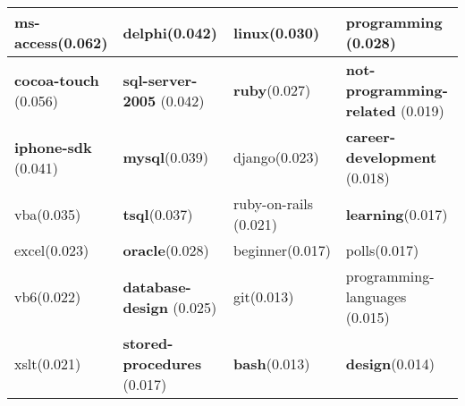 \begin{table}[htbp]
\begin{tabular}{|p{40pt}||p{40pt}||p{40pt}||p{40pt}|}
\hline
 ms-access(0.062)& delphi(0.042)& \textbf{linux}(0.030)& programming (0.028) \\ 
\hline
 \textbf{cocoa-touch} (0.056)& \textbf{sql-server-2005} (0.042)& \textbf{ruby}(0.027)& \textbf{not-programming-related} (0.019) \\ 
\hline
 \textbf{iphone-sdk} (0.041)& \textbf{mysql}(0.039)& django(0.023)& \textbf{career-development} (0.018) \\ 
\hline
 vba(0.035)& \textbf{tsql}(0.037)& ruby-on-rails (0.021)& \textbf{learning}(0.017) \\ 
\hline
 excel(0.023)& \textbf{oracle}(0.028)& beginner(0.017)& polls(0.017) \\ 
\hline
 vb6(0.022)& \textbf{database-design} (0.025)& git(0.013)& programming-languages (0.015) \\ 
\hline
 xslt(0.021)& \textbf{stored-procedures} (0.017)& \textbf{bash}(0.013)& \textbf{design}(0.014) \\ 
\hline
\end{tabular}
\end{table}

